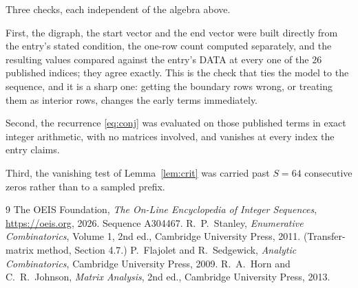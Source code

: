 \documentclass[11pt,a4paper]{article}
\theoremstyle{plain}
\theoremstyle{definition}
\begin{document}
Three checks, each independent of the algebra above.

First, the digraph, the start vector and the end vector were built directly from the
entry's stated condition, the one-row count computed separately, and the resulting values
compared against the entry's DATA at every one of the $26$ published indices; they
agree exactly. This is the check that ties the model to the sequence, and it is a sharp one:
getting the boundary rows wrong, or treating them as interior rows, changes the early terms
immediately.

Second, the recurrence \eqref{eq:conj} was evaluated on those published terms in exact
integer arithmetic, with no matrices involved, and vanishes at every index the entry claims.

Third, the vanishing test of Lemma~\ref{lem:crit} was carried past $S=64$ consecutive
zeros rather than to a sampled prefix.

\begin{thebibliography}{9}
 The OEIS Foundation, \emph{The On-Line Encyclopedia of Integer
Sequences}, \url{https://oeis.org}, 2026. Sequence A304467.
 R.~P.~Stanley, \emph{Enumerative Combinatorics}, Volume 1, 2nd ed.,
Cambridge University Press, 2011. (Transfer-matrix method, Section 4.7.)
 P.~Flajolet and R.~Sedgewick, \emph{Analytic Combinatorics}, Cambridge
University Press, 2009.
 R.~A.~Horn and C.~R.~Johnson, \emph{Matrix Analysis}, 2nd ed., Cambridge
University Press, 2013.
\end{thebibliography}
\end{document}
